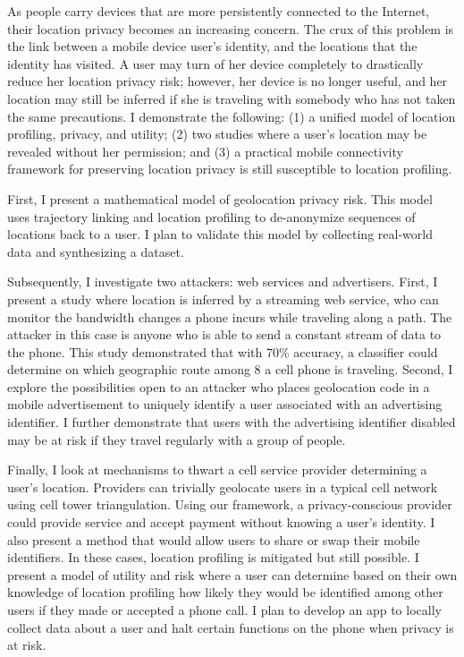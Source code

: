 
As people carry devices that are more persistently connected to the Internet, their location privacy becomes an increasing concern. The crux of this problem is the link between a mobile device user's identity, and the locations that the identity has visited. 
A user may turn of her device completely to drastically reduce her location privacy risk; however, her device is no longer useful, and her location may still be inferred if she is traveling with somebody who has not taken the same precautions. 
I demonstrate the following: (1) a unified model of location profiling, privacy, and utility; (2) two studies where a user's location may be revealed without her permission; and (3) a practical mobile connectivity framework for preserving location privacy is still susceptible to location profiling.

First, I present a mathematical model of geolocation privacy risk. This model uses trajectory linking and location profiling to de-anonymize sequences of locations back to a user. I plan to validate this model by collecting real-world data and synthesizing a dataset.

Subsequently, I investigate two attackers: web services and advertisers. First, I present a study where location is inferred by a streaming web service, who can monitor the bandwidth changes a phone incurs while traveling along a path. The attacker in this case is anyone who is able to send a constant stream of data to the phone. This study demonstrated that with 70\% accuracy, a classifier could determine on which geographic route among 8 a cell phone is traveling. Second, I explore the possibilities open to an attacker who places geolocation code in a mobile advertisement to uniquely identify a user associated with an advertising identifier. I further demonstrate that users with the advertising identifier disabled may be at risk if they travel regularly with a group of people.

Finally, I look at mechanisms to thwart a cell service provider determining a user's location. Providers can trivially geolocate users in a typical cell network using cell tower triangulation. Using our framework, a privacy-conscious provider could provide service and accept payment without knowing a user's identity. I also present a method that would allow users to share or swap their mobile identifiers. In these cases, location profiling is mitigated but still possible. I present a model of utility and risk where a user can determine based on their own knowledge of location profiling how likely they would be identified among other users if they made or accepted a phone call. I plan to develop an app to locally collect data about a user and halt certain functions on the phone when privacy is at risk.

